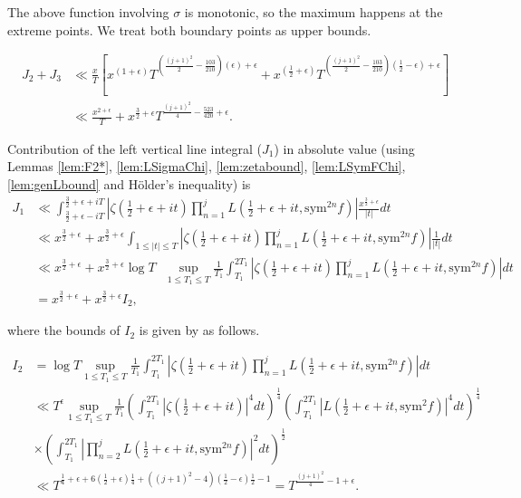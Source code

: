 \documentclass[10pt]{amsart}
\begin{document}
The above function involving $\sigma$ is monotonic, so the maximum happens at the extreme points. We treat both boundary points as upper bounds.

\begin{align*}
    J_2+J_3 &\ll \frac{x}{T}\left[ x^{(1+\epsilon)} T^{(\frac{(j+1)^2}{2}-\frac{103}{210})(\epsilon)+\epsilon} +x^{(\frac{1}{2}+\epsilon)} T^{(\frac{(j+1)^2}{2}-\frac{103}{210})(\frac{1}{2}-\epsilon)+\epsilon}\right] \\
    &\ll \frac{x^{2+\epsilon}}{T} + x^{\frac{3}{2}+\epsilon}T^{\frac{(j+1)^2}{4}-\frac{523}{420}+\epsilon} .
\end{align*}

Contribution of the left vertical line integral ($J_{1}$) in absolute value (using Lemmas \ref{lem:F2*}, \ref{lem:LSigmaChi}, \ref{lem:zetabound}, \ref{lem:LSymFChi}, \ref{lem:genLbound} and H\"older's inequality) is
\begin{align*}
J_1 &\ll \int_{\frac{3}{2}+\epsilon-iT}^{\frac{3}{2}+\epsilon+iT}\left|\zeta(\tfrac{1}{2}+\epsilon+it)\prod_{n=1}^{j}L(\tfrac{1}{2}+\epsilon+it,\mathrm{sym}^{2n}f)\right|\frac{x^{\frac{3}{2}+\epsilon}}{|t|}dt \\
&\ll x^{\frac{3}{2}+\epsilon} + x^{\frac{3}{2}+\epsilon}\int_{1 \leq |t| \leq T}\left|\zeta(\tfrac{1}{2}+\epsilon+it)\prod_{n=1}^{j}L(\tfrac{1}{2}+\epsilon+it,\mathrm{sym}^{2n}f)\right|\frac{1}{|t|}dt \\
&\ll  x^{\frac{3}{2}+\epsilon} + x^{\frac{3}{2}+\epsilon} \log T \text{ } \sup_{1 \leq T_1 \leq T}\frac{1}{T_1} \int_{T_1}^{2T_1}\left|\zeta(\tfrac{1}{2}+\epsilon+it)\prod_{n=1}^{j}L(\tfrac{1}{2}+\epsilon+it,\mathrm{sym}^{2n}f)\right| dt \\
&= x^{\frac{3}{2}+\epsilon} + x^{\frac{3}{2}+\epsilon}I_2,
\end{align*}

where the bounds of $I_2$ is given by as follows.

\begin{align}
    I_2 &=\log T \sup_{1 \leq T_1 \leq T} \frac{1}{T_1} \int_{T_1}^{2T_1}\left|\zeta(\tfrac{1}{2}+\epsilon+it)\prod_{n=1}^{j}L(\tfrac{1}{2}+\epsilon+it,\mathrm{sym}^{2n}f)\right| dt \\
    &\ll T^\epsilon \sup_{1 \leq T_1 \leq T}\frac{1}{T_1}\left(  \int_{T_1}^{2T_1}|\zeta(\frac{1}{2}+\epsilon+it)|^{4}dt \right)^\frac{1}{4}\left(\int_{T_1}^{2T_1}|L(\frac{1}{2}+\epsilon+it, \mathrm{sym}^{2}f)|^4dt\right)^\frac{1}{4} \\
    & \times \left( \int_{T_1}^{2T_1}\left| \prod_{n=2}^{j}L(\frac{1}{2}+\epsilon+it, \mathrm{sym}^{2n} f) \right|^{2}dt\right)^{\frac{1}{2}}\\
    &\ll T^{\frac{1}{4}+\epsilon + 6(\frac{1}{2}+\epsilon)\frac{1}{4}+ ((j+1)^2-4)(\frac{1}{2}-\epsilon)\frac{1}{2}-1} = T^{\frac{(j+1)^2}{4}-1+\epsilon}.
\end{align}
\end{document}
